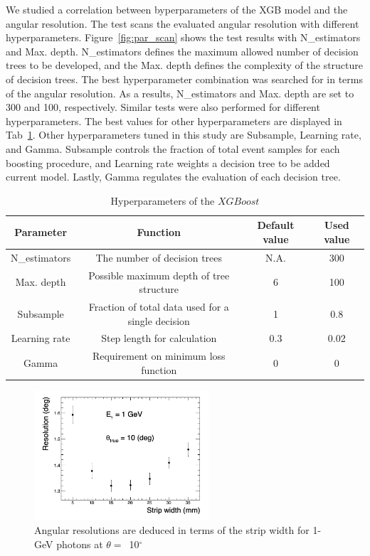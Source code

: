 \documentclass[preprint,12pt,times,a4paper]{elsarticle}
\newcommand{\XGB}{XGBoost}
\begin{document}
We studied a correlation between byperparameters of the XGB model and the angular resolution. The test scans the evaluated angular resolution with different hyperparameters. Figure~\ref{fig:par_scan} shows the test results with N\_estimators and Max. depth. N\_estimators defines the maximum allowed number of decision trees to be developed, and the Max. depth defines the complexity of the structure of decision trees. The best hyperparameter combination was searched for in terms of the angular resolution. As a results, N\_estimators and Max. depth are set to 300 and 100, respectively. Similar tests were also performed for different hyperparameters. The best values for other hyperparameters are displayed in Tab~\ref{tab:XgbPar}. Other hyperparameters tuned in this study are Subsample, Learning rate, and Gamma. Subsample controls the fraction of total event samples for each boosting procedure, and Learning rate weights a decision tree to be added current model. Lastly, Gamma regulates the evaluation of each decision tree.

\begin{table}[hbt!]
\centering
\caption{Hyperparameters of the $\XGB$}
\begin{tabular}{cccc}
\hline 
Parameter & Function & Default value & Used value \\ \hline 
N\_estimators & The number of decision trees & N.A. & 300 \\  
Max. depth & Possible maximum depth of tree structure & 6 & 100 \\ 
Subsample & Fraction of total data used for a single decision & 1 & 0.8 \\ 
Learning rate & Step length for calculation & 0.3 & 0.02 \\ 
Gamma & Requirement on minimum loss function & 0 & 0 \\ 
\hline
\end{tabular}
\label{tab:XgbPar}
\end{table}

\begin{figure}[!hbt]
\includegraphics[width=0.58\textwidth]{figures/res_width.jpg}
\caption{ Angular resolutions are deduced in terms of the strip width for 1-GeV photons at $\theta=$~10$^{\circ}$ }
\label{fig:angle_reco_width}
\end{figure}
\end{document}
